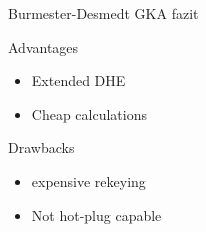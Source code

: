 \begin{frame}{Burmester-Desmedt GKA fazit}
	\begin{block}{Advantages}
		\begin{itemize}
			\item Extended DHE
			\item Cheap calculations
		\end{itemize}
	\end{block}
	\begin{alertblock}{Drawbacks}
		\begin{itemize}
			\item expensive rekeying
			\item Not hot-plug capable
		\end{itemize}
	\end{alertblock}
\end{frame}
